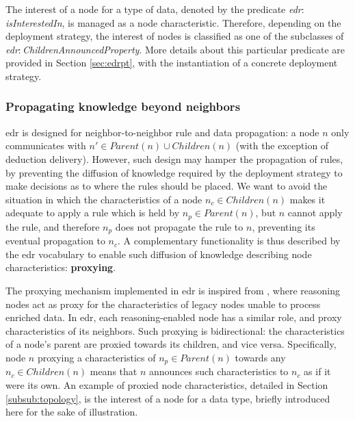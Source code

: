 \documentclass[sw]{iosart2x}
\newcommand{\namespace}[1]{\textit{#1$:$}}
\newcommand{\concept}[2]{\namespace{#1}\-\textit{#2}}
\begin{document}
The interest of a node for a type of data, denoted by the predicate \concept{edr}{is\-Interested\-In}, is managed as a node characteristic.
Therefore, depending on the deployment strategy, the interest of nodes is classified as one of the subclasses of \concept{edr}{Children\-Announced\-Property}.
More details about this particular predicate are provided in Section \textsection \ref{sec:edrpt}, with the instantiation of a concrete deployment strategy.

\subsubsection{Propagating knowledge beyond neighbors}
\label{subsubs:proxying}

\gls{edr} is designed for neighbor-to-neighbor rule and data propagation: a node $n$ only communicates with $n'\in Parent(n)\cup Children(n)$ (with the exception of deduction delivery).
However, such design may hamper the propagation of rules, by preventing the diffusion of knowledge required by the deployment strategy to make decisions as to where the rules should be placed.
We want to avoid the situation in which the characteristics of a node $n_{c}\in Children(n)$ makes it adequate to apply a rule which is held by $n_{p}\in Parent(n)$, but $n$ cannot apply the rule, and therefore $n_{p}$ does not propagate the rule to $n$, preventing its eventual propagation to $n_{c}$.
A complementary functionality is thus described by the \gls{edr} vocabulary to enable such diffusion of knowledge describing node characteristics: \textbf{proxying}.

The proxying mechanism implemented in \gls{edr} is inspired from \cite{Nikoli2011}, where reasoning nodes act as proxy for the characteristics of legacy nodes unable to process enriched data. 
In \gls{edr}, each reasoning-enabled node has a similar role, and proxy characteristics of its neighbors. 
Such proxying is bidirectional: the characteristics of a node's parent are proxied towards its children, and vice versa.
Specifically, node $n$ proxying a characteristics of $n_{p}\in Parent(n)$ towards any $n_{c}\in Children(n)$ means that $n$ announces such characteristics to $n_{c}$ as if it were its own.
An example of proxied node characteristics, detailed in Section \textsection \ref{subsub:topology}, is the interest of a node for a data type, briefly introduced here for the sake of illustration.
\end{document}
